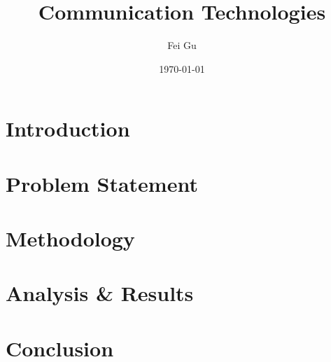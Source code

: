 \documentclass{article}
\title{Communication Technologies}
\author{Fei Gu}
\date{\today}
\begin{document}
\maketitle

\section{Introduction}

\paragraph{} 

\section{Problem Statement}

\paragraph{}

\section{Methodology}

\section{Analysis \& Results}

\section{Conclusion}
\end{document}
